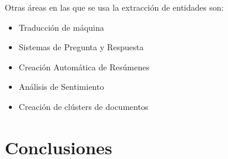 \documentclass[runningheads]{llncs}
\begin{document}
Otras áreas en las que se usa la extracción de entidades son: \cite{ner_thesis}

\begin{itemize}

\item Traducción de máquina
\item Sistemas de Pregunta y Respuesta
\item Creación Automática de Resúmenes
\item Análisis de Sentimiento
\item Creación de clústers de documentos

\end{itemize}

\section{Conclusiones}

\end{document}
